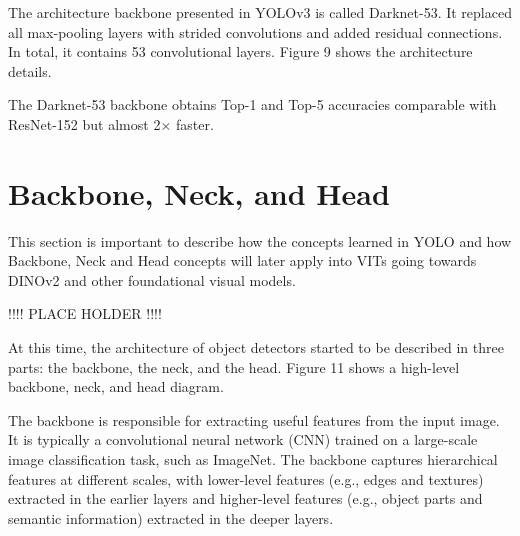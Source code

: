 \documentclass{article}
\begin{document}
The architecture backbone presented in YOLOv3 is called Darknet-53. It replaced all max-pooling layers with strided convolutions and added residual connections. In total, it contains 53 convolutional layers. Figure 9 shows the architecture details.

The Darknet-53 backbone obtains Top-1 and Top-5 accuracies comparable with ResNet-152 but almost 2× faster.



\section{Backbone, Neck, and Head}

This section is important to describe how the concepts learned in YOLO and how Backbone, Neck and Head concepts will later apply into VITs going towards DINOv2 and other foundational visual models.

!!!! PLACE HOLDER !!!!

At this time, the architecture of object detectors started to be described in three parts: the backbone, the neck, and the head. Figure 11 shows a high-level backbone, neck, and head diagram.

The backbone is responsible for extracting useful features from the input image. It is typically a convolutional neural network (CNN) trained on a large-scale image classification task, such as ImageNet. The backbone captures hierarchical features at different scales, with lower-level features (e.g., edges and textures) extracted in the earlier layers and higher-level features (e.g., object parts and semantic information) extracted in the deeper layers.
\end{document}
